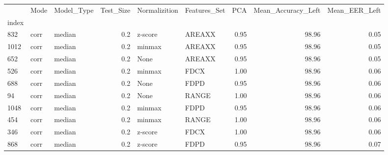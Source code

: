 \begin{tabular}{lllrllrrr}
\toprule
{} &  Mode & Model\_Type &  Test\_Size & Normalizition & Features\_Set &   PCA &  Mean\_Accuracy\_Left &  Mean\_EER\_Left \\
index &       &            &            &               &              &       &                     &                \\
\midrule
832   &  corr &     median &        0.2 &       z-score &       AREAXX &  0.95 &               98.96 &           0.05 \\
1012  &  corr &     median &        0.2 &        minmax &       AREAXX &  0.95 &               98.96 &           0.05 \\
652   &  corr &     median &        0.2 &          None &       AREAXX &  0.95 &               98.96 &           0.05 \\
526   &  corr &     median &        0.2 &        minmax &         FDCX &  1.00 &               98.96 &           0.06 \\
688   &  corr &     median &        0.2 &          None &         FDPD &  0.95 &               98.96 &           0.06 \\
94    &  corr &     median &        0.2 &          None &        RANGE &  1.00 &               98.96 &           0.06 \\
1048  &  corr &     median &        0.2 &        minmax &         FDPD &  0.95 &               98.96 &           0.06 \\
454   &  corr &     median &        0.2 &        minmax &        RANGE &  1.00 &               98.96 &           0.06 \\
346   &  corr &     median &        0.2 &       z-score &         FDCX &  1.00 &               98.96 &           0.06 \\
868   &  corr &     median &        0.2 &       z-score &         FDPD &  0.95 &               98.96 &           0.07 \\
\bottomrule
\end{tabular}
